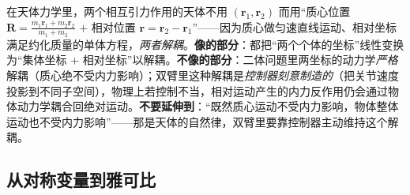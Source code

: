 \begin{insight}
在天体力学里，两个相互引力作用的天体不用 $(\mathbf{r}_1,\mathbf{r}_2)$ 而用“质心位置 $\mathbf{R}=\tfrac{m_1\mathbf{r}_1+m_2\mathbf{r}_2}{m_1+m_2}$ $+$ 相对位置 $\mathbf{r}=\mathbf{r}_2-\mathbf{r}_1$”——因为质心做匀速直线运动、相对坐标满足约化质量的单体方程，\emph{两者解耦}。\textbf{像的部分}：都把“两个个体的坐标”线性变换为“集体坐标 $+$ 相对坐标”以解耦。\textbf{不像的部分}：二体问题里两坐标的动力学\emph{严格}解耦（质心绝不受内力影响）；双臂里这种解耦是\emph{控制器刻意制造的}（把关节速度投影到不同子空间），物理上若控制不当，相对运动产生的内力反作用仍会通过物体动力学耦合回绝对运动。\textbf{不要延伸到}：“既然质心运动不受内力影响，物体整体运动也不受内力影响”——那是天体的自然律，双臂里要靠控制器主动维持这个解耦。
\end{insight}

\subsection{从对称变量到雅可比}
\label{sec:ma-jac}

